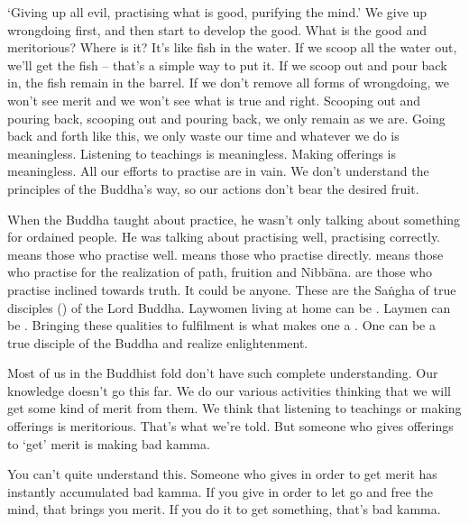 `Giving up all evil, practising what is good, purifying the mind.' We give up wrongdoing first, and then start to develop the good. What is the good and meritorious? Where is it? It's like fish in the water. If we scoop all the water out, we'll get the fish -- that's a simple way to put it. If we scoop out and pour back in, the fish remain in the barrel. If we don't remove all forms of wrongdoing, we won't see merit and we won't see what is true and right. Scooping out and pouring back, scooping out and pouring back, we only remain as we are. Going back and forth like this, we only waste our time and whatever we do is meaningless. Listening to teachings is meaningless. Making offerings is meaningless. All our efforts to practise are in vain. We don't understand the principles of the Buddha's way, so our actions don't bear the desired fruit. 

When the Buddha taught about practice, he wasn't only talking about something for ordained people. He was talking about practising well, practising correctly.  means those who practise well.  means those who practise directly.  means those who practise for the realization of path, fruition and Nibb\=ana.  are those who practise inclined towards truth. It could be anyone. These are the Sa\.ngha of true disciples () of the Lord Buddha. Laywomen living at home can be . Laymen can be . Bringing these qualities to fulfilment is what makes one a . One can be a true disciple of the Buddha and realize enlightenment. 

Most of us in the Buddhist fold don't have such complete understanding. Our knowledge doesn't go this far. We do our various activities thinking that we will get some kind of merit from them. We think that listening to teachings or making offerings is meritorious. That's what we're told. But someone who gives offerings to `get' merit is making bad kamma. 

You can't quite understand this. Someone who gives in order to get merit has instantly accumulated bad kamma. If you give in order to let go and free the mind, that brings you merit. If you do it to get something, that's bad kamma. 

